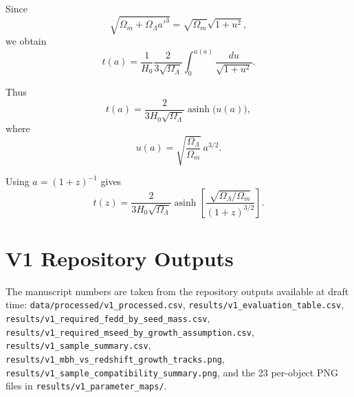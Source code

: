 \documentclass[letterpaper,12pt]{article}
\begin{document}
Since
\[
\sqrt{\Omega_m+\Omega_\Lambda a'^3}
=
\sqrt{\Omega_m}\sqrt{1+u^2},
\]
we obtain
\[
t(a)=
\frac{1}{H_0}
\frac{2}{3\sqrt{\Omega_\Lambda}}
\int_0^{u(a)}
\frac{du}{\sqrt{1+u^2}}.
\]

Thus
\[
t(a)=
\frac{2}{3H_0\sqrt{\Omega_\Lambda}}
\operatorname{asinh}\!\big(u(a)\big),
\]
where
\[
u(a)=
\sqrt{\frac{\Omega_\Lambda}{\Omega_m}}\,a^{3/2}.
\]

Using $a=(1+z)^{-1}$ gives
\[
\boxed{
t(z)=
\frac{2}{3H_0\sqrt{\Omega_\Lambda}}
\operatorname{asinh}
\left[
\frac{\sqrt{\Omega_\Lambda/\Omega_m}}{(1+z)^{3/2}}
\right]
}.
\]

\section{V1 Repository Outputs}

The manuscript numbers are taken from the repository outputs available at draft time:
\texttt{data/processed/v1\_processed.csv},
\texttt{results/v1\_evaluation\_table.csv},
\texttt{results/v1\_required\_fedd\_by\_seed\_mass.csv},
\texttt{results/v1\_required\_mseed\_by\_growth\_assumption.csv},
\texttt{results/v1\_sample\_summary.csv},
\texttt{results/v1\_mbh\_vs\_redshift\_growth\_tracks.png},
\texttt{results/v1\_sample\_compatibility\_summary.png}, and the 23 per-object PNG files in \texttt{results/v1\_parameter\_maps/}.
\end{document}
